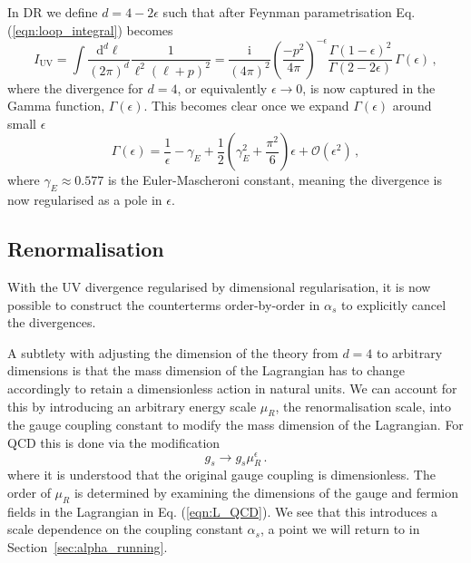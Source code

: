 \documentclass[main.tex]{subfiles}
\begin{document}
    In DR we define $d = 4 - 2\epsilon$ such that
    after Feynman parametrisation Eq. (\ref{eqn:loop_integral})
    becomes
    \begin{equation}\label{eqn:dim_reg}
        I_{\mathrm{UV}} = \int \dfrac{\mathrm{d}^{d}\ell}{(2\pi)^{d}}\dfrac{1}{\ell^{2}(\ell+p)^{2}} = \dfrac{\mathrm{i}}{(4\pi)^{2}}\left(\dfrac{-p^{2}}{4\pi}\right)^{-\epsilon}\dfrac{\Gamma(1-\epsilon)^{2}}{\Gamma(2-2\epsilon)} \, \Gamma(\epsilon) \, ,
    \end{equation}
    where the divergence for $d = 4$, or equivalently
    $\epsilon \rightarrow 0$, is now captured in the
    Gamma function, $\Gamma(\epsilon)$. This becomes clear once
    we expand $\Gamma(\epsilon)$ around small $\epsilon$
    \begin{equation}\label{eqn:gamma_laurent}
        \Gamma(\epsilon) = \dfrac{1}{\epsilon} - \gamma_{E} + \dfrac{1}{2}\left(\gamma_{E}^{2} + \dfrac{\pi^{2}}{6}\right)\epsilon + \mathcal{O}(\epsilon^{2}) \, ,
    \end{equation}
    where $\gamma_{E} \approx 0.577$ is the Euler-Mascheroni
    constant, meaning the divergence is now regularised as a pole in
    $\epsilon$.

\subsection{Renormalisation}\label{sec:renormalisation}
    With the UV divergence regularised by dimensional
    regularisation, it is now possible to construct the
    counterterms order-by-order in $\alpha_{s}$ to
    explicitly cancel the divergences.

    A subtlety with adjusting the dimension of the theory
    from $d=4$ to arbitrary dimensions is that the mass dimension
    of the Lagrangian has to change accordingly to retain a
    dimensionless action in natural units. We can account for this by
    introducing an arbitrary energy scale $\mu_{R}$, the renormalisation
    scale, into the gauge coupling
    constant to modify the mass dimension of the Lagrangian.
    For QCD this is done via the modification
    \begin{equation}\label{eqn:dimensionful_coupling}
        g_{s} \rightarrow g_{s}\mu_{R}^{\epsilon} \, .
    \end{equation}
    where it is understood that the original gauge coupling is
    dimensionless. The order of $\mu_{R}$ is determined by examining
    the dimensions of the gauge and fermion fields
    in the Lagrangian in Eq. (\ref{eqn:L_QCD}).
    We see that this introduces a scale dependence
    on the coupling constant $\alpha_{s}$, a point we will return
    to in Section~\ref{sec:alpha_running}.
\end{document}
